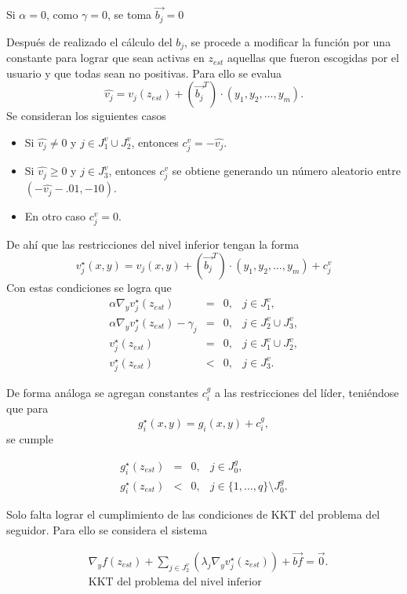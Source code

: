 Si $\alpha=0$, como $\gamma=0$, se toma  $\vec{b_j}=0$
            
Después de realizado el cálculo del $b_j$, se procede a modificar la función por una constante para lograr que sean activas en $z_{est}$ aquellas que fueron escogidas por el usuario y que todas sean no positivas. Para ello se evalua $$\hat{v_j}=v_{j}(z_{est})+ ({\vec{b_j}}^T)\cdot (y_1,y_2,\dots,y_m).$$ Se consideran los siguientes casos
\begin{itemize}
    \item Si $\hat{v_j}\neq 0$ y $j\in J_1^v\cup J_2^v$, entonces $c_j^v=-\hat{v_j}$.
\item Si $\hat{v_j}\geq 0$ y $j\in J_3^v$,  entonces  $c_j^v$ se obtiene generando un número aleatorio entre $(-\hat{v_j}-.01, -10)$.
\item En otro caso $c_j^v=0$.\end{itemize}

De ahí que las restricciones del nivel inferior tengan la forma 
\begin{equation}
	v_{j}^{\star}(x,y)=v_{j}(x,y)+ ({\vec{b_j}}^T)\cdot (y_1,y_2,\dots,y_m)+c_j^v
\end{equation}
%
Con estas condiciones se logra que 
$$\begin{array}{rcll} \alpha \nabla_y v_{j}^{\star}(z_{est})&=&0,& j\in J_1^v,\\ \alpha \nabla_y v_{j}^{\star}(z_{est})-\gamma_j&=&0,& j\in J_2^v\cup J_3^v,\\
  v_{j}^{\star}(z_{est})&=&0,& j\in J_1^v\cup J_2^v, \\  v_{j}^{\star}(z_{est})&<&0,& j\in J_3^v.\end{array}$$

De forma análoga se agregan constantes  $c_i^g$  a las restricciones del líder,  teniéndose que para $$g_{i}^{\star}(x,y)=g_{i}(x,y)+c_i^g,$$ se cumple

$$\begin{array}{rcll} 
  g_{i}^{\star}(z_{est})&=&0,& j\in J_0^g,\\  g_{i}^{\star}(z_{est})&<&0,& j\in \{1, \ldots, q\}\setminus J_0^g.\end{array}$$

Solo falta lograr el cumplimiento de las condiciones de KKT del problema del seguidor. Para ello se considera el sistema 

\begin{equation}
    \begin{aligned}
        &\nabla_{y}f(z_{est})+\sum_{j \in J_2^v}(\lambda_j\nabla_{y}v_{j}^{\star}(z_{est}))+\vec{bf}=\vec{0}.\\
        &\text{KKT del problema del nivel inferior}
    \end{aligned}
    \label{KKT_nivel_inferior}
\end{equation}

